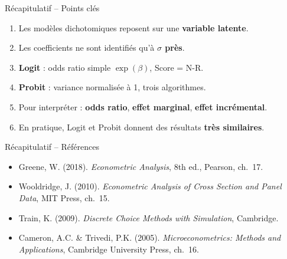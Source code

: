 \documentclass[11pt,aspectratio=169]{beamer}
\begin{document}
\begin{frame}{Récapitulatif -- Points clés}

\begin{enumerate}

\item Les modèles dichotomiques reposent sur une \textbf{variable
  latente}.\newline

\item Les coefficients ne sont identifiés qu'à \textbf{$\sigma$ près}.\newline

\item \textbf{Logit} : odds ratio simple $\exp(\beta)$,
  Score = N-R.\newline

\item \textbf{Probit} : variance normalisée à 1, trois algorithmes.\newline

\item Pour interpréter : \textbf{odds ratio}, \textbf{effet marginal},
  \textbf{effet incrémental}.\newline

\item En pratique, Logit et Probit donnent des résultats \textbf{très
  similaires}.

\end{enumerate}

\end{frame}

\begin{frame}{Récapitulatif -- Références}

\begin{itemize}

\item Greene, W. (2018). \textit{Econometric Analysis}, 8th ed., Pearson,
  ch.~17.\newline

\item Wooldridge, J. (2010). \textit{Econometric Analysis of Cross Section
  and Panel Data}, MIT Press, ch.~15.\newline

\item Train, K. (2009). \textit{Discrete Choice Methods with Simulation},
  Cambridge.\newline

\item Cameron, A.C. \& Trivedi, P.K. (2005). \textit{Microeconometrics: Methods
  and Applications}, Cambridge University Press, ch.~16.

\end{itemize}

\end{frame}
\end{document}
